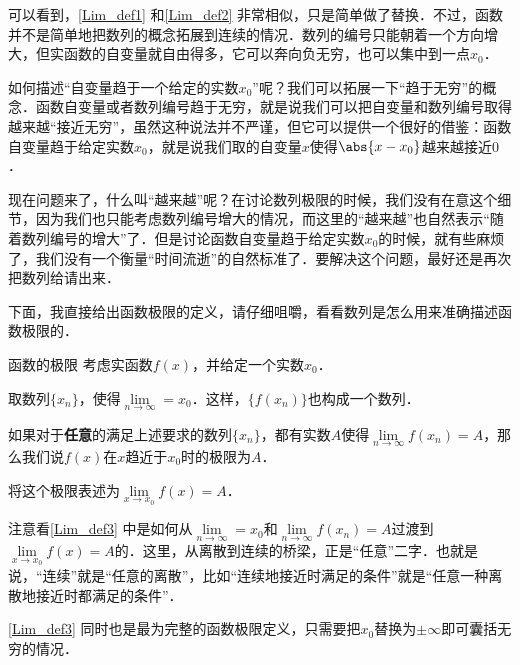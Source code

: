 可以看到，\autoref{Lim_def1} 和\autoref{Lim_def2} 非常相似，只是简单做了替换．不过，函数并不是简单地把数列的概念拓展到连续的情况．数列的编号只能朝着一个方向增大，但实函数的自变量就自由得多，它可以奔向负无穷，也可以集中到一点$x_0$．

如何描述“自变量趋于一个给定的实数$x_0$”呢？我们可以拓展一下“趋于无穷”的概念．函数自变量或者数列编号趋于无穷，就是说我们可以把自变量和数列编号取得越来越“接近无穷”，虽然这种说法并不严谨，但它可以提供一个很好的借鉴：函数自变量趋于给定实数$x_0$，就是说我们取的自变量$x$使得$\abs{x-x_0}$越来越接近$0$．

现在问题来了，什么叫“越来越”呢？在讨论数列极限的时候，我们没有在意这个细节，因为我们也只能考虑数列编号增大的情况，而这里的“越来越”也自然表示“随着数列编号的增大”了．但是讨论函数自变量趋于给定实数$x_0$的时候，就有些麻烦了，我们没有一个衡量“时间流逝”的自然标准了．要解决这个问题，最好还是再次把数列给请出来．

下面，我直接给出函数极限的定义，请仔细咀嚼，看看数列是怎么用来准确描述函数极限的．

\begin{definition}{函数的极限}\label{Lim_def3}
考虑实函数$f(x)$，并给定一个实数$x_0$．

取数列$\{x_n\}$，使得$\lim\limits_{n\to\infty}=x_0$．这样，$\{f(x_n)\}$也构成一个数列．

如果对于\textbf{任意}的满足上述要求的数列$\{x_n\}$，都有实数$A$使得$\lim\limits_{n\to\infty}f(x_n)=A$，那么我们说$f(x)$在$x$趋近于$x_0$时的极限为$A$．

将这个极限表述为$\lim\limits_{x\to x_0}f(x)=A$．
\end{definition}

注意看\autoref{Lim_def3} 中是如何从$\lim\limits_{n\to\infty}=x_0$和$\lim\limits_{n\to\infty}f(x_n)=A$过渡到$\lim\limits_{x\to x_0}f(x)=A$的．这里，从离散到连续的桥梁，正是“任意”二字．也就是说，“连续”就是“任意的离散”，比如“连续地接近时满足的条件”就是“任意一种离散地接近时都满足的条件”．

\autoref{Lim_def3} 同时也是最为完整的函数极限定义，只需要把$x_0$替换为$\pm\infty$即可囊括无穷的情况．



